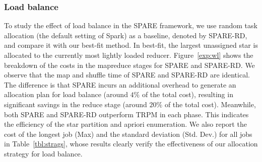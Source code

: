 \subsubsection{Load balance}
To study the effect of load balance in the SPARE framework, we use random task allocation (the default setting of Spark) as a baseline, denoted by SPARE-RD, and compare it with our best-fit method. In best-fit, the largest unassigned star is allocated to the currently most lightly loaded reducer.
Figure~\ref{exp:wl} shows the breakdown of the costs in the mapreduce stages 
for SPARE and SPARE-RD. %
We observe that the map and shuffle time of SPARE and SPARE-RD are identical. The difference is that SPARE incurs an additional overhead to generate an allocation plan for load balance (around $4\%$ of the total cost), resulting in significant savings in the reduce stage (around $20\%$ of the total cost). 
Meanwhile, both SPARE and SPARE-RD outperform TRPM in each phase. This indicates the 
efficiency of the star partition and apriori enumeration.
We also report the cost of the longest job (Max) and the standard deviation (Std. Dev.)
for all jobs in Table~\ref{tbl:strags}, whose results clearly verify the effectiveness of our allocation strategy for load balance.



